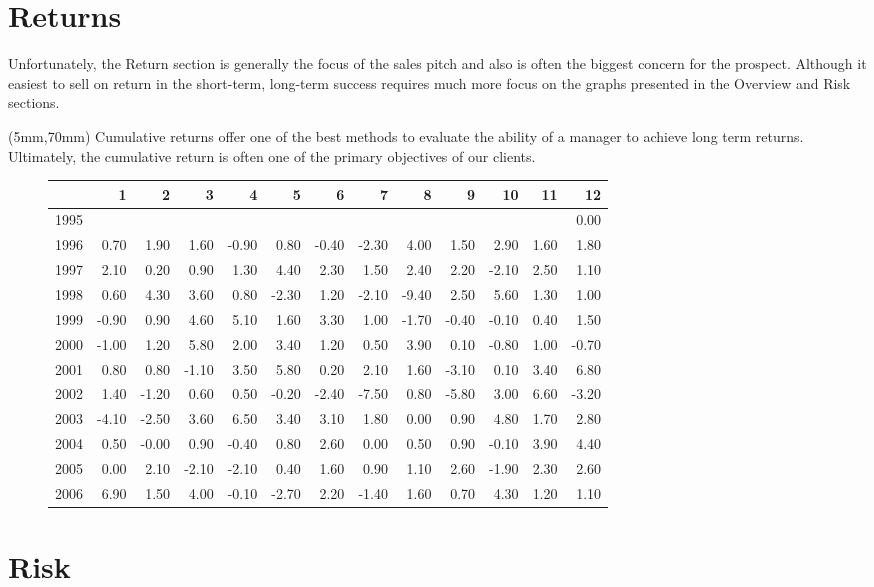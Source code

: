 \documentclass[nohyper,justified]{tufte-handout}
\begin{document}
\newpage
\section{Returns}
\begin{wide}
{\Large Unfortunately, the Return section is generally the focus of the sales pitch and also is often the biggest concern for the prospect.  Although it easiest to sell on return in the short-term, long-term success requires much more focus on the graphs presented in the Overview and Risk sections.}
\end{wide}

\begin{textblock*}{150mm}(5mm,70mm)
Cumulative returns offer one of the best methods to evaluate the ability of a manager to achieve long term returns.  Ultimately, the cumulative return is often one of the primary objectives of our clients.
\newline
\begin{figure}
\begin{tabular}{rrrrrrrrrrrrr}
  \hline
 & 1 & 2 & 3 & 4 & 5 & 6 & 7 & 8 & 9 & 10 & 11 & 12 \\ 
  \hline
1995 &  &  &  &  &  &  &  &  &  &  &  & 0.00 \\ 
  1996 & 0.70 & 1.90 & 1.60 & -0.90 & 0.80 & -0.40 & -2.30 & 4.00 & 1.50 & 2.90 & 1.60 & 1.80 \\ 
  1997 & 2.10 & 0.20 & 0.90 & 1.30 & 4.40 & 2.30 & 1.50 & 2.40 & 2.20 & -2.10 & 2.50 & 1.10 \\ 
  1998 & 0.60 & 4.30 & 3.60 & 0.80 & -2.30 & 1.20 & -2.10 & -9.40 & 2.50 & 5.60 & 1.30 & 1.00 \\ 
  1999 & -0.90 & 0.90 & 4.60 & 5.10 & 1.60 & 3.30 & 1.00 & -1.70 & -0.40 & -0.10 & 0.40 & 1.50 \\ 
  2000 & -1.00 & 1.20 & 5.80 & 2.00 & 3.40 & 1.20 & 0.50 & 3.90 & 0.10 & -0.80 & 1.00 & -0.70 \\ 
  2001 & 0.80 & 0.80 & -1.10 & 3.50 & 5.80 & 0.20 & 2.10 & 1.60 & -3.10 & 0.10 & 3.40 & 6.80 \\ 
  2002 & 1.40 & -1.20 & 0.60 & 0.50 & -0.20 & -2.40 & -7.50 & 0.80 & -5.80 & 3.00 & 6.60 & -3.20 \\ 
  2003 & -4.10 & -2.50 & 3.60 & 6.50 & 3.40 & 3.10 & 1.80 & 0.00 & 0.90 & 4.80 & 1.70 & 2.80 \\ 
  2004 & 0.50 & -0.00 & 0.90 & -0.40 & 0.80 & 2.60 & 0.00 & 0.50 & 0.90 & -0.10 & 3.90 & 4.40 \\ 
  2005 & 0.00 & 2.10 & -2.10 & -2.10 & 0.40 & 1.60 & 0.90 & 1.10 & 2.60 & -1.90 & 2.30 & 2.60 \\ 
  2006 & 6.90 & 1.50 & 4.00 & -0.10 & -2.70 & 2.20 & -1.40 & 1.60 & 0.70 & 4.30 & 1.20 & 1.10 \\ 
   \hline
\end{tabular}%
\end{figure}
\end{textblock*}
\newpage
\section{Risk}
\end{document}
